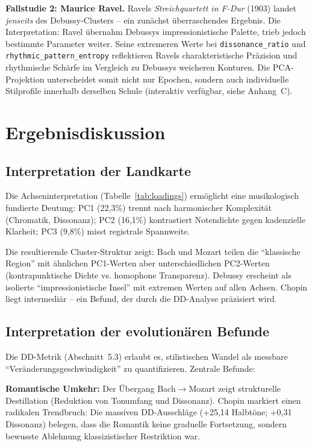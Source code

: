 \documentclass[12pt,a4paper]{article}
\theoremstyle{definition}
\begin{document}
\textbf{Fallstudie 2: Maurice Ravel.} Ravels \emph{Streichquartett in F-Dur} (1903) landet \emph{jenseits} des Debussy-Clusters -- ein zunächst überraschendes Ergebnis. Die Interpretation: Ravel übernahm Debussys impressionistische Palette, trieb jedoch bestimmte Parameter weiter. Seine extremeren Werte bei \texttt{dissonance\_ratio} und \texttt{rhythmic\_pattern\_entropy} reflektieren Ravels charakteristische Präzision und rhythmische Schärfe im Vergleich zu Debussys weicheren Konturen. Die PCA-Projektion unterscheidet somit nicht nur Epochen, sondern auch individuelle Stilprofile innerhalb derselben Schule (interaktiv verfügbar, siehe Anhang~C).

\section{Ergebnisdiskussion}
\subsection{Interpretation der Landkarte}
Die Achseninterpretation (Tabelle~\ref{tab:loadings}) ermöglicht eine musikologisch fundierte Deutung: PC1 (22,3\%) trennt nach harmonischer Komplexität (Chromatik, Dissonanz); PC2 (16,1\%) kontrastiert Notendichte gegen kadenzielle Klarheit; PC3 (9,8\%) misst registrale Spannweite.

Die resultierende Cluster-Struktur zeigt: Bach und Mozart teilen die \enquote{klassische Region} mit ähnlichen PC1-Werten aber unterschiedlichen PC2-Werten (kontrapunktische Dichte vs. homophone Transparenz). Debussy erscheint als isolierte \enquote{impressionistische Insel} mit extremen Werten auf allen Achsen. Chopin liegt intermediär -- ein Befund, der durch die DD-Analyse präzisiert wird.

\subsection{Interpretation der evolutionären Befunde}
Die DD-Metrik (Abschnitt~5.3) erlaubt es, stilistischen Wandel als messbare \enquote{Veränderungsgeschwindigkeit} zu quantifizieren. Zentrale Befunde:

\textbf{Romantische Umkehr:} Der Übergang Bach$\to$Mozart zeigt strukturelle Destillation (Reduktion von Tonumfang und Dissonanz). Chopin markiert einen radikalen Trendbruch: Die massiven DD-Ausschläge (+25,14 Halbtöne; +0,31 Dissonanz) belegen, dass die Romantik keine graduelle Fortsetzung, sondern bewusste Ablehnung klassizistischer Restriktion war.
\end{document}
